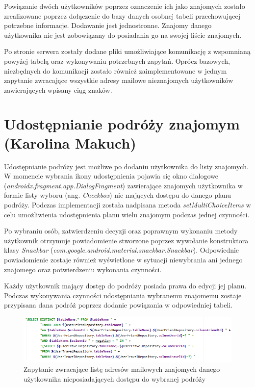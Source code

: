\documentclass[10pt,twoside,a4paper]{report}
\begin{document}
\par Powiązanie dwóch użytkowników poprzez oznaczenie ich jako znajomych zostało zrealizowane poprzez dołączenie do bazy danych osobnej tabeli przechowującej potrzebne informacje. Dodawanie jest jednostronne. Znajomy danego użytkownika nie jest zobowiązany do posiadania go na swojej liście znajomych.
\par Po stronie serwera zostały dodane pliki umożliwiające komunikację z wspomnianą powyżej tabelą oraz wykonywaniu potrzebnych zapytań. Oprócz bazowych, niezbędnych do komunikacji zostało również zaimplementowane w jednym zapytanie zwracające wszystkie adresy mailowe nieznajomych użytkowników zawierających wpisany ciąg znaków.

\section{Udostępnianie podróży znajomym (Karolina Makuch)}

\par  Udostępnianie podróży jest możliwe po dodaniu użytkownika do listy znajomych. W momencie wybrania ikony udostępnienia pojawia się okno dialogowe (\textit{androidx.fragment.app.DialogFragment}) zawierające znajomych użytkownika w formie  listy wyboru (ang. \textit{Checkbox}) nie mających dostępu do danego planu podróży. Podczas implementacji została nadpisana metoda \textit{setMultiChoiceItems} w celu umożliwienia udostępnienia planu wielu znajomym podczas jednej czynności.
\par  Po wybraniu osób, zatwierdzeniu decyzji oraz poprawnym wykonaniu metody użytkownik otrzymuje powiadomienie stworzone poprzez wywołanie konstruktora klasy \textit{Snackbar}
(\textit{com.google.android.material.snackbar.Snackbar}). Odpowiednie powiadomienie zostaje również wyświetlone w sytuacji niewybrania ani jednego znajomego oraz potwierdzeniu wykonania czynności.
\par  Każdy użytkownik mający dostęp do podróży posiada prawa do edycji jej planu. Podczas wykonywania czynności udostępniania wybranemu znajomemu zostaje przypisana dana podróż poprzez dodanie powiązania w odpowiedniej tabeli.

\begin{figure}[h]
\centering
\includegraphics[width=\linewidth]{getFriendsBySharedTravel}
\caption{Zapytanie zwracające listę adresów mailowych znajomych danego użytkownika nieposiadających dostępu do wybranej podróży}
\label{fig:getFriendsBySharedTravel}
\end{figure}
\end{document}
